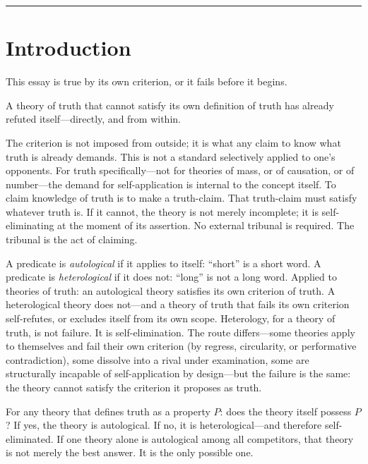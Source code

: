 \documentclass[11pt, oneside]{article}
\begin{document}
\vspace{1em}
{\color{LogosGray}\centering\rule{0.45\textwidth}{0.4pt}\par}
\vspace{1.2em}

\section*{Introduction}

\noindent This essay is true by its own criterion, or it fails before it begins.

A theory of truth that cannot satisfy its own definition of truth has
already refuted itself---directly, and from within.

The criterion is not imposed from outside; it is what any claim to know
what truth is already demands. This is not a standard selectively applied to one's opponents. For truth specifically---not for
theories of mass, or of causation, or of number---the demand for
self-application is internal to the concept itself. To claim knowledge of
truth is to make a truth-claim. That truth-claim must satisfy whatever
truth is. If it cannot, the theory is not merely incomplete; it is
self-eliminating at the moment of its assertion. No external tribunal is
required. The tribunal is the act of claiming.

A predicate is \textit{autological} if it applies to itself: ``short''
is a short word. A predicate is \textit{heterological} if it does not:
``long'' is not a long word. Applied to theories of truth: an autological
theory satisfies its own criterion of truth. A heterological theory does
not---and a theory of truth that fails its own criterion self-refutes, or
excludes itself from its own scope. Heterology, for a theory of truth, is
not failure. It is self-elimination. The route differs---some theories apply to themselves and fail their
own criterion (by regress, circularity, or performative contradiction), some dissolve
into a rival under examination, some are structurally incapable of
self-application by design---but the failure is the same: the theory
cannot satisfy the criterion it proposes as truth.

For any theory that defines truth as a property $P$: does the theory
itself possess $P$? If yes, the theory is autological. If no, it is
heterological---and therefore self-eliminated. If one theory alone is
autological among all competitors, that theory is not merely the best
answer. It is the only possible one.
\end{document}
